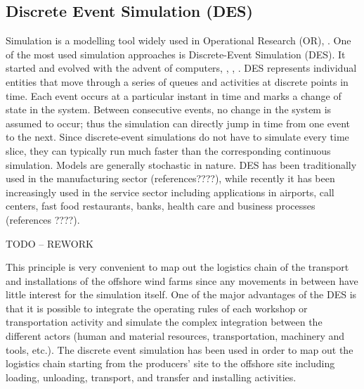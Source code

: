 \subsection{Discrete Event Simulation (DES)}
Simulation is a modelling tool widely used in Operational Research (OR), \cite{pidd2005computer}. One of the most used simulation approaches is Discrete-Event Simulation (DES). It started and evolved with the advent of computers, \cite{Myron1987}, \cite {William1988}, \cite{robinson2005}. DES represents individual entities that move through a series of queues and activities at discrete points in time. Each event occurs at a particular instant in time and marks a change of state in the system. Between consecutive events, no change in the system is assumed to occur; thus the simulation can directly jump in time from one event to the next. Since discrete-event simulations do not have to simulate every time slice, they can typically run much faster than the corresponding continuous simulation. Models are generally stochastic in nature. DES has been traditionally used in the manufacturing sector \cite{KhedriLiraviasl20151490} (references????), while recently it has been increasingly used in the service sector including applications in airports, call centers, fast food restaurants, banks, health care \cite{Chemweno201445} and business processes (references ????).

TODO -- REWORK







This principle is very convenient to map out the logistics chain of the transport and installations of the offshore wind farms since any movements in between have little interest for the simulation itself. One of the major advantages of the DES is that it is possible to integrate the operating rules of each workshop or transportation activity and simulate the complex integration between the different actors (human and material resources, transportation, machinery and tools, etc.).  
The discrete event simulation has been used in order to map out the logistics chain starting from the producers’ site to the offshore site including loading, unloading, transport, and transfer and installing activities.

